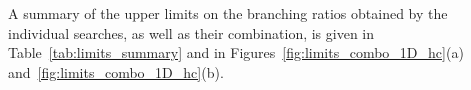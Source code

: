 \documentclass[PAPER, coverpage, atlasdraft=true, texlive=2016, UKenglish]{\ATLASLATEXPATH atlasdoc}
\begin{document}
A summary of the upper limits on the branching ratios obtained by the individual searches, as well as their combination, is given  
in Table~\ref{tab:limits_summary} and in Figures~\ref{fig:limits_combo_1D_hc}(a) and~\ref{fig:limits_combo_1D_hc}(b).
\end{document}
